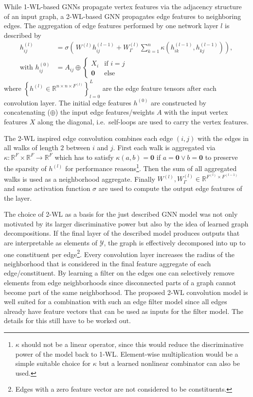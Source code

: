 \documentclass[12pt]{scrartcl}
\begin{document}
While 1-WL-based GNNs propagate vertex features via the adjacency structure of an input graph, a 2-WL-based GNN propagates edge features to neighboring edges.
The aggregation of edge features performed by one network layer $l$ is described by
\begin{align}
	h^{(l)}_{i j} &= \sigma\left(\, W^{(l)} h^{(l - 1)}_{i j} + W^{(l)}_{\Gamma} \sum_{k = 1}^{n} \kappa\left(h^{(l - 1)}_{i k}, h^{(l - 1)}_{k j}\right)\right), \\
	\text{with } h^{(0)}_{i j} &= A_{i j} \oplus \begin{cases}
		X_i & \text{if } i = j \\
		\bm{0} & \text{else}
	\end{cases}
\end{align}
where ${\left\{ h^{(l)} \in \mathbb{R}^{n \times n \times F^{(l)}} \right\}}_{l = 0}^{L}$ are the edge feature tensors after each convolution layer. %
The initial edge features $h^{(0)}$ are constructed by concatenating ($\oplus$) the input edge features/weights $A$ with the input vertex features $X$ along the diagonal, i.e.\ self-loops are used to carry the vertex features.

The 2-WL inspired edge convolution combines each edge $(i, j)$ with the edges in all walks of length $2$ between $i$ and $j$.
First each walk is aggregated via $\kappa: \mathbb{R}^{F} \times \mathbb{R}^{F} \to \mathbb{R}^{F}$ which has to satisfy $\kappa(a, b) = \bm{0}$ if $a = \bm{0} \lor b = \bm{0}$ to preserve the sparsity of $h^{(l)}$ for performance reasons\footnote{
	$\kappa$ should not be a linear operator, since this would reduce the discriminative power of the model back to 1-WL.\@
	Element-wise multiplication would be a simple suitable choice for $\kappa$ but a learned nonlinear combinator can also be used.
}.
Then the sum of all aggregated walks is used as a neighborhood aggregate.
Finally $W^{(l)}, W^{(l)}_{\Gamma} \in \mathbb{R}^{F^{(l)} \times F^{(l - 1)}}$ and some activation function $\sigma$ are used to compute the output edge features of the layer.

The choice of 2-WL as a basis for the just described GNN model was not only motivated by its larger discriminative power but also by the idea of learned graph decompositions.
If the final layer of the described model produces outputs that are interpretable as elements of $\mathcal{Y}$, the graph is effectively decomposed into up to one constituent per edge\footnote{
	Edges with a zero feature vector are not considered to be constituents.
}.
Every convolution layer increases the radius of the neighborhood that is considered in the final feature aggregate of each edge/constituent.
By learning a filter on the edges one can selectively remove elements from edge neighborhoods since disconnected parts of a graph cannot become part of the same neighborhood.
The proposed 2-WL convolution model is well suited for a combination with such an edge filter model since all edges already have feature vectors that can be used as inputs for the filter model.
The details for this still have to be worked out.
\end{document}
